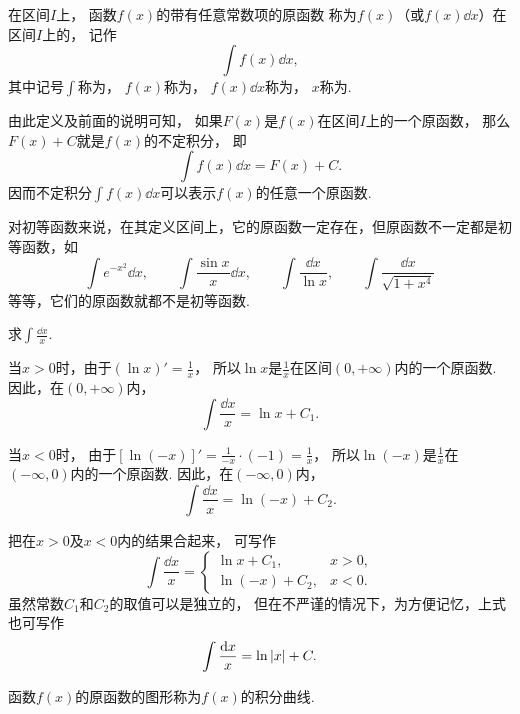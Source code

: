 \begin{definition}
在区间\(I\)上，
函数\(f(x)\)的带有任意常数项的原函数
称为\(f(x)\)（或\(f(x) \dd{x}\)）在区间\(I\)上的，
记作\[
	\int f(x) \dd{x},
\]
其中记号\(\int\)称为，
\(f(x)\)称为，
\(f(x)\dd{x}\)称为，
\(x\)称为.
\end{definition}
由此定义及前面的说明可知，
如果\(F(x)\)是\(f(x)\)在区间\(I\)上的一个原函数，
那么\(F(x) + C\)就是\(f(x)\)的不定积分，
即\[
	\int f(x) \dd{x} = F(x) + C.
\]
因而不定积分\(\int f(x) \dd{x}\)可以表示\(f(x)\)的任意一个原函数.

对初等函数来说，在其定义区间上，它的原函数一定存在，但原函数不一定都是初等函数，如\[
	\int e^{-x^2} \dd{x}, \qquad
	\int \frac{\sin x}{x} \dd{x}, \qquad
	\int \frac{\dd{x}}{\ln{x}}, \qquad
	\int \frac{\dd{x}}{\sqrt{1+x^4}}
\]
等等，它们的原函数就都不是初等函数.

\begin{example}
求\(\int \frac{\dd{x}}{x}\).
\begin{solution}
当\(x > 0\)时，由于\((\ln x)' = \frac{1}{x}\)，
所以\(\ln x\)是\(\frac{1}{x}\)在区间\((0,+\infty)\)内的一个原函数.
因此，在\((0,+\infty)\)内，\[
\int \frac{\dd{x}}{x} = \ln x + C_1.
\]

当\(x < 0\)时，
由于\([\ln(-x)]' = \frac{1}{-x} \cdot (-1) = \frac{1}{x}\)，
所以\(\ln(-x)\)是\(\frac{1}{x}\)在\((-\infty,0)\)内的一个原函数.
因此，在\((-\infty,0)\)内，\[
	\int \frac{\dd{x}}{x} = \ln(-x) + C_2.
\]

把在\(x > 0\)及\(x < 0\)内的结果合起来，
可写作\begin{equation}
	\int \frac{\dd{x}}{x} = \left\{ \begin{array}{lc}
		\ln x + C_1, & x>0, \\
		\ln(-x) + C_2, & x<0.
	\end{array} \right.
\end{equation}
虽然常数\(C_1\)和\(C_2\)的取值可以是独立的，
但在不严谨的情况下，为方便记忆，上式也可写作\begin{equation}
	\int \frac{\dd{x}}{x} = \ln\abs{x} + C.
\end{equation}
\end{solution}
\end{example}

\begin{definition}
函数\(f(x)\)的原函数的图形称为\(f(x)\)的积分曲线.
\end{definition}

